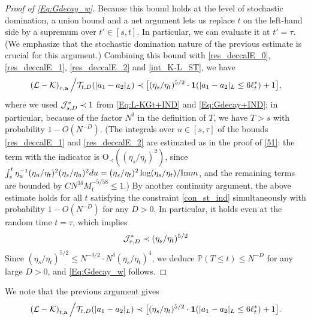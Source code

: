 \begin{proof}[Proof of \eqref{Eq:Gdecay_w}]
% 
Because this bound holds at the level of stochastic domination, a union bound and a net argument lets us replace $t$ on the left-hand side by a supremum over $t'\in[s,t]$. In particular, we can evaluate it at $t'=\tau$. (We emphasize that the stochastic domination nature of the previous estimate is crucial for this argument.) Combining this  bound with  \eqref{res_deccalE_0}, \eqref{res_deccalE_1},   \eqref{res_deccalE_2}  and  \eqref{int_K-L_ST}, we have 
$$
\left({\cal L}-{\cal K}\right)_{\tau, \textbf{a}}\Big/{\cal T}_{t, D}(|a_1-a_2|_{L}) \prec   \big [ (\eta_s/\eta_t)^{5/2}  \cdot {\bf 1}(|a_1-a_2|_{L}\le 6\ell_t^*)+1 \big ], 
$$
where we used ${\cal J}^*_{s,D} \prec 1$ from \eqref{Eq:L-KGt+IND} and \eqref{Eq:Gdecay+IND}; in particular, because of the factor $N^{\delta}$ in the definition of $T$, we have $T>s$ with probability $1-O(N^{-D})$. (The integrals over $u\in[s,\tau]$ of the bounds \eqref{res_deccalE_1} and \eqref{res_deccalE_2} are estimated as in the proof of \eqref{51}: the term with the indicator is $\mathrm{O}_{\prec}((\eta_s/\eta_t)^{2})$, since $\int_s^t\eta_u^{-1}(\eta_u/\eta_t)^2(\eta_s/\eta_u)^2du=(\eta_s/\eta_t)^{2}\log(\eta_s/\eta_t)/\mathrm{Im} m$, and the remaining terms are bounded by $CN^{3\delta}M_t^{-5/58}\leq1$.) By another continuity argument, the above estimate holds for all $t$ satisfying the constraint \eqref{con_st_ind} simultaneously with probability $1-O(N^{-D})$ for any $D>0$. In particular, it holds even at the random time $t=\tau$, which implies
\begin{align}\label{52}
 {\cal J}^*_{\tau,D}\prec     (\eta_s/\eta_t)^{5/2}  
\end{align}
 Since $(\eta_s/\eta_t)^{5/2}\leq N^{-\delta/2}\cdot N^{\delta}(\eta_s/\eta_t)^{4}$, we deduce 
${\mathbb P} (T\le t )\leq N^{-D}$ for any large $D>0$, and \eqref{Eq:Gdecay_w} follows.    
\end{proof}
 
 
 
 We note that the previous argument gives
\begin{align}\label{53}
\left({\cal L}-{\cal K}\right)_{t, \textbf{a}}\Big/{\cal T}_{t, D}(|a_1-a_2|_{L}) \prec   \big [ (\eta_s/\eta_t)^{5/2}  \cdot {\bf 1}(|a_1-a_2|_{L}\le 6\ell_t^*)+1 \big ].
\end{align}






